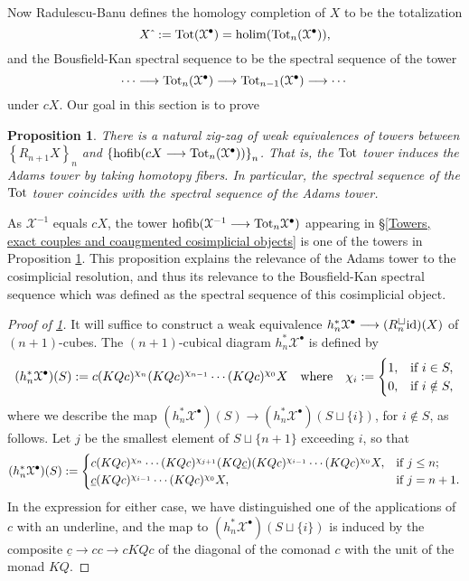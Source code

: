 \documentclass[11pt]{amsart} \renewcommand{\baselinestretch}{1.2}
\theoremstyle{plain}
\newtheorem{prop}[thm]{Proposition}
\theoremstyle{definition}
\DeclareMathOperator*{\holim}{holim}
\DeclareMathOperator*{\hofib}{hofib}
\renewcommand{\to}{\longrightarrow}
\newcommand{\calx}{\mathcal{X}}
\newcommand{\Id}{\mathrm{id}}
\newcommand{\plainD}{R}
\begin{document}
\begin{Bousfield-Kan spectral sequence}
Now Radulescu-Banu defines the homology completion of $X$ to be the totalization
\[X\hat{\ }:=\textup{Tot}(\calx^\bullet)=\holim (\textup{Tot}_n(\calx^\bullet)),\]
and the Bousfield-Kan spectral sequence to be the spectral sequence of the tower
\[\cdots \to\textup{Tot}_n(\calx^\bullet)\to \textup{Tot}_{n-1}(\calx^\bullet)\to\cdots \]
under $cX$. Our goal in this section is to prove
\begin{prop}
\label{towerIdentification}
There is a natural zig-zag of weak equivalences of towers between $\left\{\plainD_{n+1}X\right\}_n$ and $\left\{\hofib(cX\to\textup{Tot}_{n}(\calx^\bullet))\right\}_n$. That is,  the $\textup{Tot}$ tower induces the Adams tower by taking homotopy fibers. In particular, the spectral sequence of the $\textup{Tot}$ tower coincides with the spectral sequence of the Adams tower.
\end{prop}
\noindent As $\calx^{-1}$ equals $cX$, the tower $\hofib(\calx^{-1}\to\textup{Tot}_n\calx^{\bullet})$ appearing in \S\ref{Towers, exact couples and coaugmented cosimplicial objects} is one of the towers in Proposition \ref{towerIdentification}. This proposition explains the relevance of the Adams tower to the cosimplicial resolution, and thus its relevance to the Bousfield-Kan spectral sequence which was defined as the spectral sequence of this cosimplicial object.
\begin{proof}[Proof of \ref{towerIdentification}] 
It will suffice to construct a weak equivalence $h_n^*\calx^\bullet\to (\plainD_n^{\smash{\square}}\Id  )(X)$ of $(n+1)$-cubes. The $(n+1)$-cubical diagram $h_n^*\calx^\bullet$ is defined by
\[(h_n^*\calx^\bullet)(S):= c(KQc)^{\chi_{n}}(KQc)^{\chi_{n-1}}\cdots (KQc)^{\chi_0}X\quad \textup{where}\quad \chi_i:=\begin{cases}
1,&\textup{if }i\in S,\\
0,&\textup{if }i\notin S,
\end{cases}
\]
where we describe the map $(h_n^*\calx^\bullet)(S)\to (h_n^*\calx^\bullet)(S\sqcup\{i\})$, for $i\notin S$, as follows. Let $j$ be the smallest element of $S\sqcup\{n+1\}$ exceeding $i$, so that
\[(h_n^*\calx^\bullet)(S):= \begin{cases}
c(KQc)^{\chi_{n}}\cdots (KQc)^{\chi_{j+1}}(KQ\underline{c})(KQc)^{\chi_{i-1}}\cdots (KQc)^{\chi_0}X,&\textup{if }j\leq n;\\
\underline{c}(KQc)^{\chi_{i-1}}\cdots (KQc)^{\chi_0}X,&\textup{if }j=n+1.
\end{cases}
\]
In the expression for either case, we have distinguished one of the applications of $c$ with an underline, and the map to $(h_n^*\calx^\bullet)(S\sqcup\{i\})$ is induced by the composite $\underline{c}\to cc\to cKQc$ of the diagonal of the comonad $c$ with the unit of the monad $KQ$. 


\end{proof}
\end{Bousfield-Kan spectral sequence}
\end{document}

